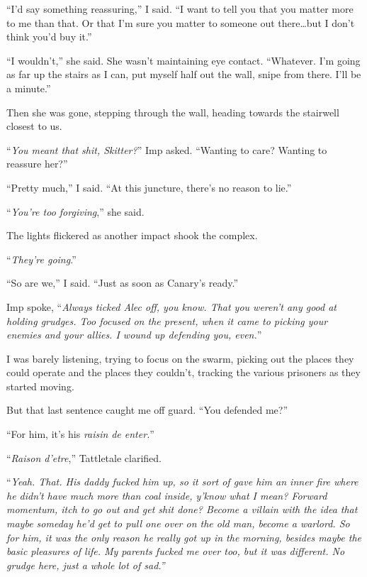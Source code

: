 ``I'd say something reassuring,'' I said.  ``I want to tell you that you matter more to me than that.  Or that I'm sure you matter to someone out there\ldots but I don't think you'd buy it.''



``I wouldn't,'' she said.  She wasn't maintaining eye contact.  ``Whatever.  I'm going as far up the stairs as I can, put myself half out the wall, snipe from there.  I'll be a minute.''



Then she was gone, stepping through the wall, heading towards the stairwell closest to us.



``\emph{You meant that shit, Skitter?}''  Imp asked.  ``Wanting to care?  Wanting to reassure her?''



``Pretty much,'' I said.  ``At this juncture, there's no reason to lie.''



``\emph{You're too forgiving},'' she said.



The lights flickered as another impact shook the complex.



``\emph{They're going}.''



``So are we,'' I said.  ``Just as soon as Canary's ready.''



Imp spoke, ``\emph{Always ticked Alec off, you know.  That you weren't any good at holding grudges.  Too focused on the present, when it came to picking your enemies and your allies.  I wound up defending you, even.}''



I was barely listening, trying to focus on the swarm, picking out the places they could operate and the places they couldn't, tracking the various prisoners as they started moving.



But that last sentence caught me off guard.  ``You defended me?''



``For him, it's his \emph{raisin }\emph{de enter.}''



``\emph{Raison d'etre},'' Tattletale clarified.



``\emph{Yeah.  That.  His daddy fucked him up, so it sort of gave him an inner fire where he didn't have much more than coal inside, y'know what I mean?  Forward momentum, itch to go out and get shit done?  Become a villain with the idea that maybe someday he'd get to pull one over on the old man, become a warlord.  So for him, it was the only reason he really got up in the morning, besides maybe the basic pleasures of life.  My parents fucked me over too, but it was different.  No grudge here, just a whole lot of sad.''}



